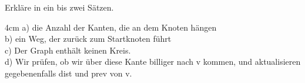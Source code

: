 \question[4]
Erkläre in ein bis zwei Sätzen.
\begin{solutionbox}{4cm}
a) die Anzahl der Kanten, die an dem Knoten hängen \\
b) ein Weg, der zurück zum Startknoten führt \\
c) Der Graph enthält keinen Kreis. \\
d) Wir prüfen, ob wir über diese Kante billiger nach v kommen, und aktualisieren gegebenenfalls dist und prev von v.
\end{solutionbox}
